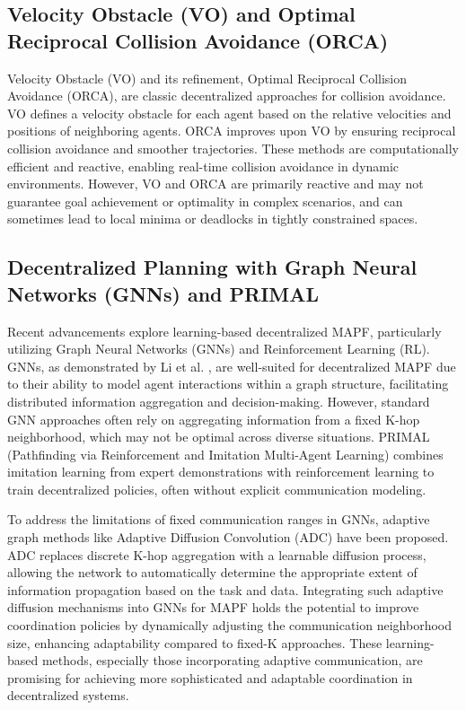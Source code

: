 \subsection{Velocity Obstacle (VO) and Optimal Reciprocal Collision Avoidance (ORCA)}
Velocity Obstacle (VO) \cite{VanDenBerg2008ORCA} %
and its refinement, Optimal Reciprocal Collision Avoidance (ORCA), are classic decentralized approaches for collision avoidance. VO defines a velocity obstacle for each agent based on the relative velocities and positions of neighboring agents. ORCA improves upon VO by ensuring reciprocal collision avoidance and smoother trajectories. These methods are computationally efficient and reactive, enabling real-time collision avoidance in dynamic environments. However, VO and ORCA are primarily reactive and may not guarantee goal achievement or optimality in complex scenarios, and can sometimes lead to local minima or deadlocks in tightly constrained spaces.

\subsection{Decentralized Planning with Graph Neural Networks (GNNs) and PRIMAL }
Recent advancements explore learning-based decentralized MAPF, particularly utilizing Graph Neural Networks (GNNs) and Reinforcement Learning (RL). GNNs, as demonstrated by Li et al. \cite{Li2021GNNCoordination}, %
are well-suited for decentralized MAPF due to their ability to model agent interactions within a graph structure, facilitating distributed information aggregation and decision-making. However, standard GNN approaches often rely on aggregating information from a fixed K-hop neighborhood, which may not be optimal across diverse situations. PRIMAL (Pathfinding via Reinforcement and Imitation Multi-Agent Learning) \cite{Sartoretti_et_al_2019} combines imitation learning from expert demonstrations with reinforcement learning to train decentralized policies, often without explicit communication modeling.

To address the limitations of fixed communication ranges in GNNs, adaptive graph methods like Adaptive Diffusion Convolution (ADC) \cite{Zhao2021ADC} have been proposed. ADC replaces discrete K-hop aggregation with a learnable diffusion process, allowing the network to automatically determine the appropriate extent of information propagation based on the task and data. Integrating such adaptive diffusion mechanisms into GNNs for MAPF holds the potential to improve coordination policies by dynamically adjusting the communication neighborhood size, enhancing adaptability compared to fixed-K approaches. These learning-based methods, especially those incorporating adaptive communication, are promising for achieving more sophisticated and adaptable coordination in decentralized systems.

